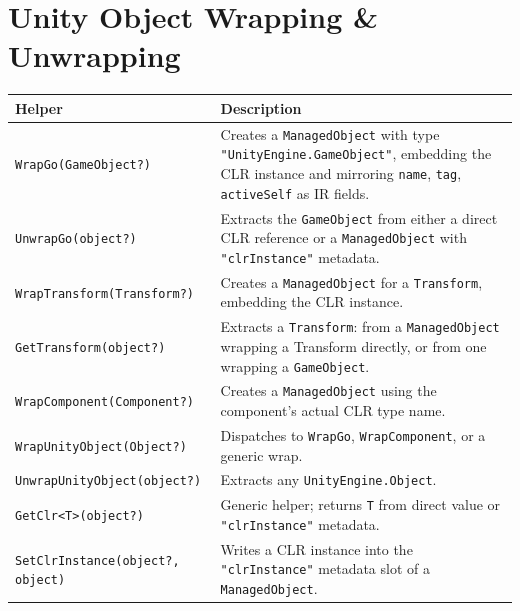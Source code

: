 \documentclass[11pt,a4paper]{article}
\newcommand{\code}[1]{\texttt{\small #1}}
\newcommand{\typename}[1]{\textcolor{typecolor}{\texttt{\small #1}}}
\begin{document}
\section{Unity Object Wrapping \& Unwrapping}

\begin{longtable}{lp{9cm}}
  \toprule
  \textbf{Helper} & \textbf{Description} \\
  \midrule
  \endhead
  \code{WrapGo(GameObject?)}          & Creates a \typename{ManagedObject} with
                                        type \code{"UnityEngine.GameObject"},
                                        embedding the CLR instance and mirroring
                                        \code{name}, \code{tag},
                                        \code{activeSelf} as IR fields. \\
  \code{UnwrapGo(object?)}            & Extracts the \typename{GameObject} from
                                        either a direct CLR reference or a
                                        \typename{ManagedObject} with
                                        \code{"clrInstance"} metadata. \\
  \code{WrapTransform(Transform?)}    & Creates a \typename{ManagedObject} for a
                                        \code{Transform}, embedding the CLR
                                        instance. \\
  \code{GetTransform(object?)}        & Extracts a \typename{Transform}: from a
                                        \typename{ManagedObject} wrapping a
                                        Transform directly, or from one wrapping a
                                        \typename{GameObject}. \\
  \code{WrapComponent(Component?)}    & Creates a \typename{ManagedObject} using
                                        the component's actual CLR type name. \\
  \code{WrapUnityObject(Object?)}     & Dispatches to \code{WrapGo},
                                        \code{WrapComponent}, or a generic wrap. \\
  \code{UnwrapUnityObject(object?)}   & Extracts any \code{UnityEngine.Object}. \\
  \code{GetClr<T>(object?)}           & Generic helper; returns \code{T} from
                                        direct value or \code{"clrInstance"}
                                        metadata. \\
  \code{SetClrInstance(object?, object)} & Writes a CLR instance into the
                                           \code{"clrInstance"} metadata slot
                                           of a \typename{ManagedObject}. \\
  \bottomrule
\end{longtable}
\end{document}
